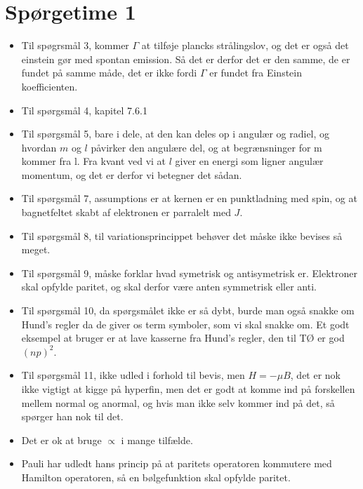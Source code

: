\documentclass[a4paper,oneside,article]{memoir}
\begin{document}
\newpage
\section*{Spørgetime 1}
\begin{itemize}
    \item Til spøgrsmål 3, kommer $Γ$ at tilføje plancks strålingslov, og det er også det einstein gør med spontan emission. 
    Så det er derfor det er den samme, de er fundet på samme måde, det er ikke fordi $Γ$ er fundet fra Einstein koefficienten. 
    \item Til spørgsmål 4, kapitel 7.6.1
    \item Til spørgsmål 5, bare i dele, at den kan deles op i angulær og radiel, og hvordan $m$ og $l$ påvirker den angulære del, og at begrænsninger for m kommer fra l.
    Fra kvant ved vi at $l$ giver en energi som ligner angulær momentum, og det er derfor vi betegner det sådan. 
    \item Til spørgsmål 7, assumptions er at kernen er en punktladning med spin, og at bagnetfeltet skabt af elektronen er parralelt med $J$. 
    \item Til spørgsmål 8, til variationsprincippet behøver det måske ikke bevises så meget. 
    \item Til spørgsmål 9, måske forklar hvad symetrisk og antisymetrisk er. Elektroner skal opfylde paritet, og skal derfor være anten symmetrisk eller anti. 
    \item Til spørgsmål 10, da spørgsmålet ikke er så dybt, burde man også snakke om Hund's regler da de giver os term symboler, som vi skal snakke om. 
    Et godt eksempel at bruger er at lave kasserne fra Hund's regler, den til TØ er god $(np)^2$. 
    \item Til spørgsmål 11, ikke udled i forhold til bevis, men $H=-μB$, det er nok ikke vigtigt at kigge på hyperfin, men det er godt at komme ind på forskellen mellem normal og anormal, 
    og hvis man ikke selv kommer ind på det, så spørger han nok til det. 
    \item Det er ok at bruge $\propto$ i mange tilfælde. 
    \item Pauli har udledt hans princip på at paritets operatoren kommutere med Hamilton operatoren, så en bølgefunktion skal opfylde paritet. 
\end{itemize}

\newpage
\end{document}
